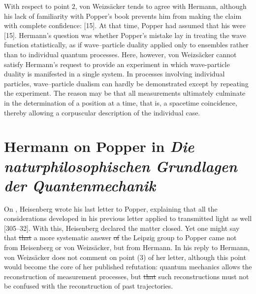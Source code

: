 \documentclass[pdflatex]{sn-jnl}
\newcommand{\vW}{von Weizsäcker\xspace}
\providecommand{\DIFadd}[1]{{\protect\color{blue}\uwave{#1}}} %
\providecommand{\DIFdel}[1]{{\protect\color{red}\sout{#1}}}                      %
\providecommand{\DIFaddbegin}{} %
\providecommand{\DIFaddend}{} %
\providecommand{\DIFdelbegin}{} %
\providecommand{\DIFdelend}{} %
\begin{document}
With respect to point $2$, \vW tends to agree with Hermann, although his lack of familiarity with Popper's book prevents him from making the claim with complete confidence:  [15]. At that time, Popper had assumed that his  were  [15]. Hermann's question was whether Popper's mistake lay in treating the wave function statistically, as if wave--particle duality applied only to ensembles rather than to individual quantum processes. Here, however, \vW cannot satisfy Hermann's request to provide an experiment in which wave-particle duality is manifested in a single system. In processes involving individual particles, wave--particle dualism can hardly be demonstrated except by repeating the experiment. The reason may be that all measurements ultimately culminate in the determination of a position at a time, that is, a spacetime coincidence, thereby allowing a corpuscular description of the individual case.

\DIFdelbegin %

\DIFdelend \section{Hermann on Popper in \emph{Die naturphilosophischen Grundlagen der Quantenmechanik}}


On , Heisenberg wrote his last letter to Popper, explaining that all the considerations developed in his previous letter applied to transmitted light as well [305--32]. With this, Heisenberg declared the matter closed. Yet one might say that \DIFdelbegin \DIFdel{that }\DIFdelend a more systematic  answer \DIFdelbegin \DIFdel{of }\DIFdelend \DIFaddbegin \DIFadd{from }\DIFaddend the Leipzig group to Popper came not from Heisenberg or \vW, but from Hermann. In his reply to Hermann, \vW does not comment on point (3) of her letter, although this point would become the core of her published refutation: quantum mechanics allows the reconstruction of measurement processes, but \DIFdelbegin \DIFdel{that }\DIFdelend such reconstructions must not be confused with the reconstruction of past trajectories.
\end{document}
